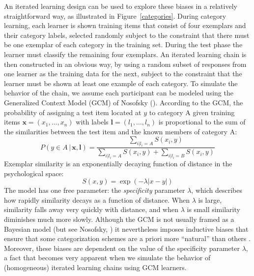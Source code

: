 \documentclass[doc]{apa6}
\newcommand{\given}{\, | \,}
\begin{document}
An iterated learning design can be used to explore these biases in a relatively straightforward way, as illustrated in Figure~\ref{categories}. During category learning, each learner is shown training items that consist of four exemplars and their category labels, selected randomly subject to the constraint that there must be one exemplar of each category in the training set. During the test phase the learner must classify the remaining four exemplars. An iterated learning chain is then constructed in an obvious way, by using a random subset of responses from one learner as the training data for the next, subject to the constraint that the learner must be shown at least one example of each category. To simulate the behavior of the chain, we assume each participant can be modeled using the Generalized Context Model (GCM) of Nosofsky (\citeyear{nosofsky_attention_1986}). According to the GCM, the probability of assigning a test item located at $y$ to category A given training items $\bm{x} = (x_1,\ldots,x_n)$ with labels $\bm{l} = (l_1, \ldots, l_n)$ is proportional to the sum of the similarities between the test item and the known members of category A:
$$
P(y \in A \given \bm{x}, \bm{l}) = \frac{\sum_{i | l_i = A} S(x_i,y)}{\sum_{i | l_i = A} S(x_i,y) + \sum_{i | l_i = B} S(x_i,y)}
$$
Exemplar similarity is an exponentially decaying function of distance in the psychological space:
$$
S(x,y) = \exp( -\lambda |x-y|)
$$
The model has one free parameter: the {\it specificity} parameter $\lambda$, which describes how rapidly similarity decays as a function of distance. When $\lambda$ is large, similarity falls away very quickly with distance, and when $\lambda$ is small similarity diminishes much more slowly. Although the GCM is not usually framed as a Bayesian model (but see Nosofsky, \citeyear{nosofsky_relation_1991}) it nevertheless imposes inductive biases that ensure that some categorization schemes are a priori more ``natural'' than others \parencite{pothos_predicting_2009}. Moreover, these biases are dependent on the value of the specificity parameter $\lambda$, a fact that becomes very apparent when we simulate the behavior of (homogeneous) iterated learning chains using GCM learners. 
\end{document}
